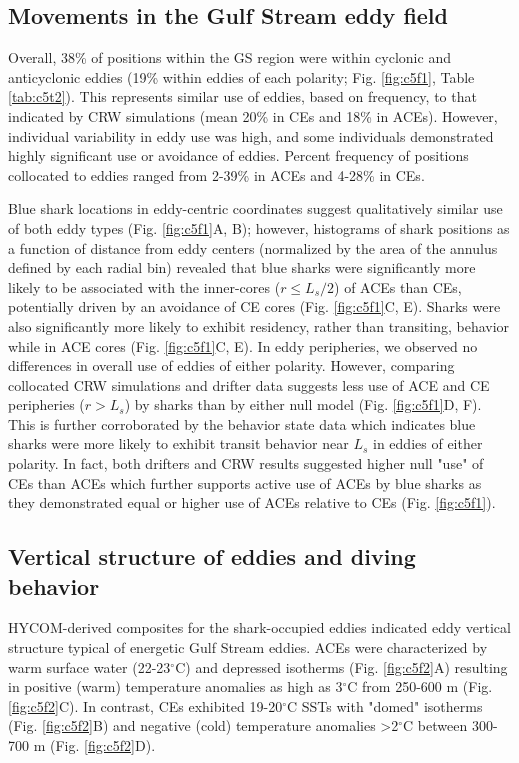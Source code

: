 \subsection{Movements in the Gulf Stream eddy field}

Overall, 38\% of positions within the GS region were within cyclonic and anticyclonic eddies (19\% within eddies of each polarity; Fig. \cref{fig:c5f1}, Table \cref{tab:c5t2}). This represents similar use of eddies, based on frequency, to that indicated by CRW simulations (mean 20\% in CEs and 18\% in ACEs). However, individual variability in eddy use was high, and some individuals demonstrated highly significant use or avoidance of eddies. Percent frequency of positions collocated to eddies ranged from 2-39\% in ACEs and 4-28\% in CEs.

Blue shark locations in eddy-centric coordinates suggest qualitatively similar use of both eddy types (Fig. \cref{fig:c5f1}A, B); however, histograms of shark positions as a function of distance from eddy centers (normalized by the area of the annulus defined by each radial bin) revealed that blue sharks were significantly more likely to be associated with the inner-cores ($r \leq L_s / 2$) of ACEs than CEs, potentially driven by an avoidance of CE cores (Fig. \cref{fig:c5f1}C, E). Sharks were also significantly more likely to exhibit residency, rather than transiting, behavior while in ACE cores (Fig. \cref{fig:c5f1}C, E). In eddy peripheries, we observed no differences in overall use of eddies of either polarity. However, comparing collocated CRW simulations and drifter data suggests less use of ACE and CE peripheries ($r > L_s$) by sharks than by either null model (Fig. \cref{fig:c5f1}D, F). This is further corroborated by the behavior state data which indicates blue sharks were more likely to exhibit transit behavior near $L_s$ in eddies of either polarity. In fact, both drifters and CRW results suggested higher null "use" of CEs than ACEs which further supports active use of ACEs by blue sharks as they demonstrated equal or higher use of ACEs relative to CEs (Fig. \cref{fig:c5f1}).

\subsection{Vertical structure of eddies and diving behavior}

HYCOM-derived composites for the shark-occupied eddies indicated eddy vertical structure typical of energetic Gulf Stream eddies. ACEs were characterized by warm surface water (22-23$^\circ$C) and depressed isotherms (Fig. \cref{fig:c5f2}A) resulting in positive (warm) temperature anomalies as high as 3$^\circ$C from 250-600 m (Fig. \cref{fig:c5f2}C). In contrast, CEs exhibited 19-20$^\circ$C SSTs with "domed" isotherms (Fig. \cref{fig:c5f2}B) and negative (cold) temperature anomalies >2$^\circ$C between 300-700 m (Fig. \cref{fig:c5f2}D).

